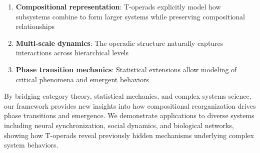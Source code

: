\begin{enumerate}[leftmargin=*]
  \item \textbf{Compositional representation}: T-operads explicitly model how subsystems combine to form larger systems while preserving compositional relationships
  \item \textbf{Multi-scale dynamics}: The operadic structure naturally captures interactions across hierarchical levels
  \item \textbf{Phase transition mechanics}: Statistical extensions allow modeling of critical phenomena and emergent behaviors
\end{enumerate}

By bridging category theory, statistical mechanics, and complex systems science, our framework provides new insights into how compositional reorganization drives phase transitions and emergence. We demonstrate applications to diverse systems including neural synchronization, social dynamics, and biological networks, showing how T-operads reveal previously hidden mechanisms underlying complex system behaviors.